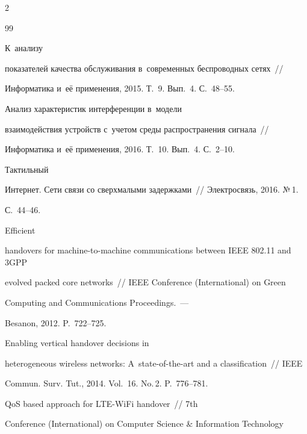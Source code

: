 \begin{multicols}{2}
{{\begin{thebibliography}{99}


 К~анализу 


показателей качества обслуживания в~современных беспроводных сетях~// 


Информатика и~её применения, 2015. Т.~9. Вып.~4. С.~48--55.







 Анализ характеристик интерференции в~модели 


взаимодействия устройств с~учетом среды распространения сигнала~// 


Информатика и~её применения, 2016. Т.~10. Вып.~4. С.~2--10.




 Тактильный 


Интернет. Сети связи со сверхмалыми задержками~// Электросвязь, 2016. №\,1. 


С.~44--46.




 Efficient 


handovers for machine-to-machine communications between IEEE 802.11 and 3GPP 


evolved packed core networks~//  IEEE  Conference (International) on Green 


Computing and Communications Proceedings.~--- 


\mbox{Besan{\!}on}, 2012. P.~722--725.




 Enabling vertical handover decisions in 


heterogeneous wireless networks: A~state-of-the-art and a classification~// IEEE 


Commun. Surv.  Tut., 2014. Vol.~16. No.\,2. P.~776--781.




 QoS based approach for LTE-WiFi handover~// 7th 


Conference (International) on Computer Science \& Information Technology 



\end{thebibliography}}}
\end{multicols}
